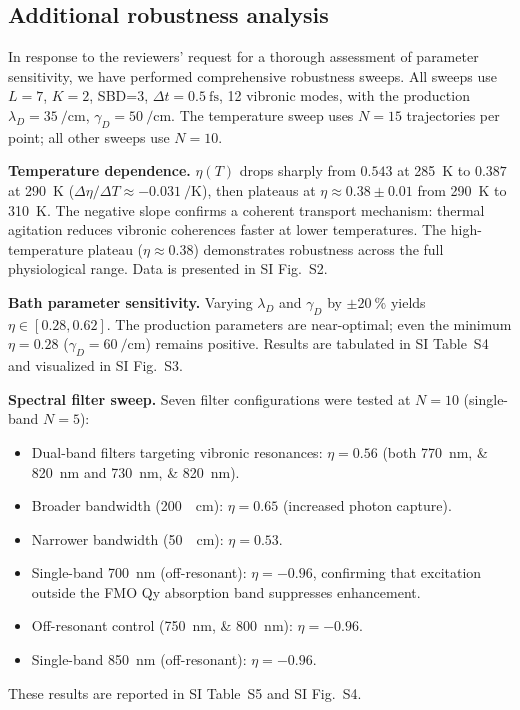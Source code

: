 \documentclass[11pt]{article}
\begin{document}
\subsection*{Additional robustness analysis}

In response to the reviewers' request for a thorough assessment of parameter sensitivity, we have performed comprehensive robustness sweeps. All sweeps use $L=7$, $K=2$, SBD=3, $\Delta t = \SI{0.5}{\femto\second}$, 12 vibronic modes, with the production $\lambda_D = \SI{35}{\per\centi\meter}$, $\gamma_D = \SI{50}{\per\centi\meter}$. The temperature sweep uses $N=15$ trajectories per point; all other sweeps use $N=10$.

\textbf{Temperature dependence.} $\eta(T)$ drops sharply from $\num{0.543}$ at \SI{285}{\kelvin} to $\num{0.387}$ at \SI{290}{\kelvin} ($\Delta\eta/\Delta T \approx \SI{-0.031}{\per\kelvin}$), then plateaus at $\eta \approx \num{0.38}\pm\num{0.01}$ from \SI{290}{\kelvin} to \SI{310}{\kelvin}. The negative slope confirms a coherent transport mechanism: thermal agitation reduces vibronic coherences faster at lower temperatures. The high-temperature plateau ($\eta \approx \num{0.38}$) demonstrates robustness across the full physiological range. Data is presented in SI Fig.~S2.

\textbf{Bath parameter sensitivity.} Varying $\lambda_D$ and $\gamma_D$ by $\pm\SI{20}{\percent}$ yields $\eta \in [\num{0.28}, \num{0.62}]$. The production parameters are near-optimal; even the minimum $\eta = \num{0.28}$ ($\gamma_D = \SI{60}{\per\centi\meter}$) remains positive. Results are tabulated in SI Table~S4 and visualized in SI Fig.~S3.

\textbf{Spectral filter sweep.} Seven filter configurations were tested at $N=10$ (single-band $N=5$):
\begin{itemize}
    \item Dual-band filters targeting vibronic resonances: $\eta = \num{0.56}$ (both \SIlist{770;820}{\nano\meter} and \SIlist{730;820}{\nano\meter}).
    \item Broader bandwidth (\SI{200}{\per\centi\meter}): $\eta = \num{0.65}$ (increased photon capture).
    \item Narrower bandwidth (\SI{50}{\per\centi\meter}): $\eta = \num{0.53}$.
    \item Single-band 700~nm (off-resonant): $\eta = \num{-0.96}$, confirming that excitation outside the FMO Qy absorption band suppresses enhancement.
    \item Off-resonant control (\SIlist{750;800}{\nano\meter}): $\eta = \num{-0.96}$.
    \item Single-band 850~nm (off-resonant): $\eta = \num{-0.96}$.
\end{itemize}
These results are reported in SI Table~S5 and SI Fig.~S4.
\end{document}
